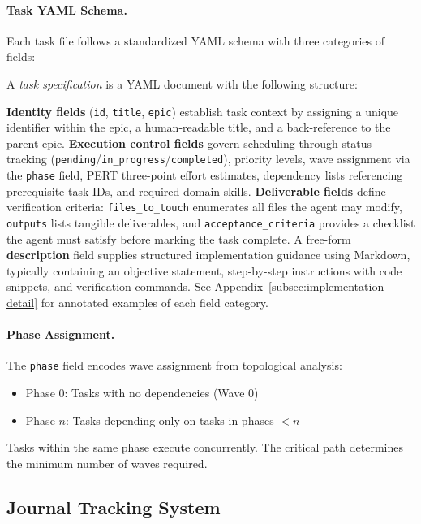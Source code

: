 \paragraph{Task YAML Schema.}
Each task file follows a standardized YAML schema with three categories of fields:

\begin{definition}
\label{def:task-spec}
A \textit{task specification} is a YAML document with the following structure:
\end{definition}

\textbf{Identity fields} (\texttt{id}, \texttt{title}, \texttt{epic}) establish
task context by assigning a unique identifier within the epic, a human-readable
title, and a back-reference to the parent epic.
%
\textbf{Execution control fields} govern scheduling through status tracking
(\texttt{pending}/\texttt{in\_progress}/\texttt{completed}), priority levels,
wave assignment via the \texttt{phase} field, PERT three-point effort estimates,
dependency lists referencing prerequisite task IDs, and required domain skills.
%
\textbf{Deliverable fields} define verification criteria: \texttt{files\_to\_touch}
enumerates all files the agent may modify, \texttt{outputs} lists tangible
deliverables, and \texttt{acceptance\_criteria} provides a checklist the agent
must satisfy before marking the task complete.
%
A free-form \textbf{description} field supplies structured implementation
guidance using Markdown, typically containing an objective statement,
step-by-step instructions with code snippets, and verification commands.
See Appendix~\ref{subsec:implementation-detail} for annotated examples of each
field category.

\paragraph{Phase Assignment.}
The \texttt{phase} field encodes wave assignment from topological analysis:
\begin{itemize}
    \item Phase 0: Tasks with no dependencies (Wave 0)
    \item Phase $n$: Tasks depending only on tasks in phases $< n$
\end{itemize}

Tasks within the same phase execute concurrently. The critical path determines
the minimum number of waves required.

\subsection{Journal Tracking System}
\label{subsec:journal}

